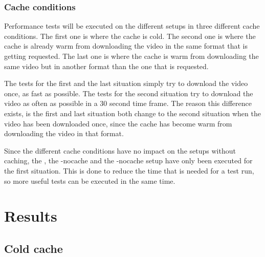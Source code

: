 \documentclass[twoside,openright]{uva-bachelor-thesis}
\begin{document}
\subsubsection{Cache conditions}
Performance tests will be executed on the different setups in three different
cache conditions. The first one is where the cache is cold. The second one is
where the cache is already warm from downloading the video in the same format
that is getting requested. The last one is where the cache is warm from
downloading the same video but in another format than the one that is requested.

The tests for the first and the last situation simply try to download the video
once, as fast as possible. The tests for the second situation try to download
the video as often as possible in a 30 second time frame. The reason this
difference exists, is the first and last situation both change to the second
situation when the video has been downloaded once, since the cache has become
warm from downloading the video in that format.

Since the different cache conditions have no impact on the setups without
caching, the \ipp, the \cdn-nocache and the \lt-nocache setup have only been
executed for the first situation. This is done to reduce the time that is needed
for a test run, so more useful tests can be executed in the same time.



\section{Results}
\subsection{Cold cache}
\end{document}

